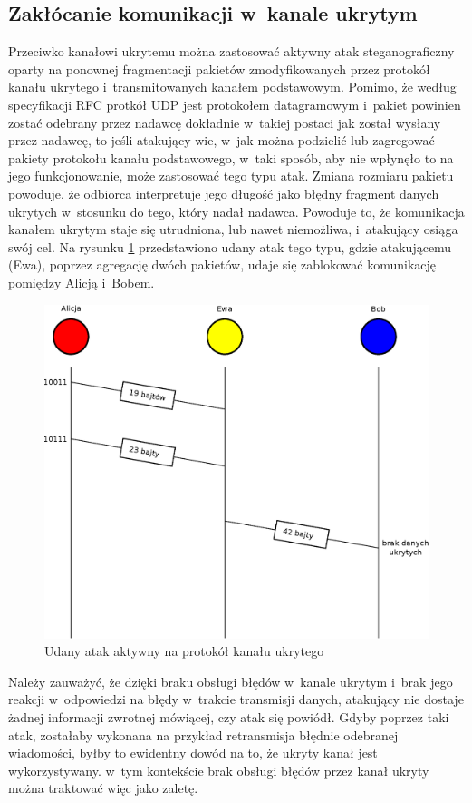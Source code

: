 \documentclass[a4paper, twoside, 12pt]{report}
\begin{document}
       \subsection{Zakłócanie komunikacji w~kanale ukrytym}
       Przeciwko kanałowi ukrytemu można zastosować aktywny atak steganograficzny
       oparty na ponownej fragmentacji pakietów zmodyfikowanych przez protokół
       kanału ukrytego i~transmitowanych kanałem podstawowym. Pomimo, że według
       specyfikacji RFC protkół UDP jest protokołem datagramowym i~pakiet powinien
       zostać odebrany przez nadawcę dokładnie w~takiej postaci jak został wysłany przez
       nadawcę, to jeśli atakujący wie, w~jak można podzielić lub zagregować
       pakiety protokołu kanału podstawowego, w~taki sposób, aby nie wpłynęło to na
       jego funkcjonowanie, może zastosować tego typu atak. Zmiana rozmiaru pakietu
       powoduje, że odbiorca interpretuje jego długość jako błędny fragment danych
       ukrytych w~stosunku do tego, który nadał nadawca. Powoduje to, że komunikacja
       kanałem ukrytym staje się utrudniona, lub nawet niemożliwa, i~atakujący osiąga
       swój cel. Na rysunku \ref{UDANYATAKAKTYWNY} przedstawiono udany atak tego typu,
       gdzie atakującemu (Ewa), poprzez agregację dwóch pakietów,
       udaje się zablokować komunikację pomiędzy Alicją i~Bobem.
        \begin{figure}[h]
                \centering
                \includegraphics[scale=0.7]{udany_atak}
                \caption{Udany atak aktywny na protokół kanału ukrytego}
                \label{UDANYATAKAKTYWNY}
        \end{figure}
       Należy zauważyć, że dzięki braku obsługi błędów w~kanale ukrytym
       i~brak jego reakcji w~odpowiedzi na błędy w~trakcie transmisji danych, atakujący
       nie dostaje żadnej informacji zwrotnej mówiącej, czy atak się powiódł. Gdyby
       poprzez taki atak, zostałaby wykonana na przykład retransmisja błędnie odebranej
       wiadomości, byłby to ewidentny dowód na to, że ukryty kanał jest wykorzystywany.
       w~tym kontekście brak obsługi błędów przez kanał ukryty można traktować więc
       jako zaletę.
\end{document}
